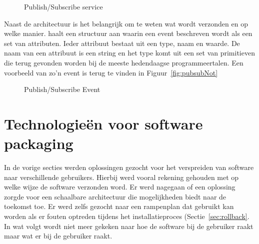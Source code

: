 \begin{figure}[!ht]
\centering
{}
\caption{Publish/Subscribe service \citep{carzaniga2001design}}
\label{fig:pubsubService}
\end{figure}

Naast de architectuur is het belangrijk om te weten wat wordt verzonden en op welke manier.
\citet{carzaniga2001design} haalt een structuur aan waarin een event beschreven wordt als een set van attributen.
Ieder attribuut bestaat uit een type, naam en waarde.
De naam van een attribuut is een string en het type komt uit een set van primitieven die terug gevonden worden bij de meeste hedendaagse programmeertalen.
Een voorbeeld van zo'n event is terug te vinden in Figuur~\vref{fig:pubsubNot}

\begin{figure}[!ht]
\centering
{}
\caption{Publish/Subscribe Event \citep{carzaniga2001design}}
\label{fig:pubsubNot}
\end{figure}

\section{Technologieën voor software packaging}\label{sec:technologieen}
In de vorige secties werden oplossingen gezocht voor het verspreiden van software naar verschillende gebruikers.
Hierbij werd vooral rekening gehouden met op welke wijze de software verzonden word.
Er werd nagegaan of een oplossing zorgde voor een schaalbare architectuur die mogelijkheden biedt naar de toekomst toe.
Er werd zelfs gezocht naar een rampenplan dat gebruikt kan worden als er fouten optreden tijdens het installatieproces (Sectie~\vref{sec:rollback}.
In wat volgt wordt niet meer gekeken naar hoe de software bij de gebruiker raakt maar wat er bij de gebruiker raakt.

